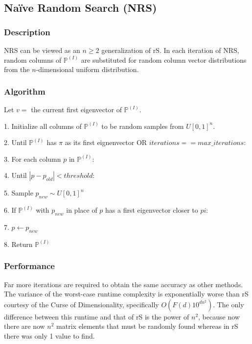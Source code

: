 \documentclass{article}
\begin{document}
\subsection{Na\"ive Random Search (NRS)}
\subsubsection{Description}
NRS can be viewed as an $n \geq 2$ generalization of rS. In each iteration of NRS, random columns of $\mathbb{P}^{(I)}$ are substituted for random column vector distributions from the $n$-dimensional uniform distribution.

\subsubsection{Algorithm}
Let $v=$ the current first eigenvector of $\mathbb{P}^{(I)}$.

1. Initialize all columns of $\mathbb{P}^{(I)}$ to be random samples from $U[0,1]^n$.

2. Until $\mathbb{P}^{(I)}$ has $\pi$ as its first eignenvector OR $iterations == max\_iterations$:

3. \hspace{1cm} For each column $p$ in $\mathbb{P}^{(I)}$:

4. \hspace{1cm}\hspace{1cm} Until $|p - p_{old}|< threshold$:

5. \hspace{1cm}\hspace{1cm}\hspace{1cm} Sample $p_{new} \sim U[0,1]^n$

6. \hspace{1cm}\hspace{1cm}\hspace{1cm} If $\mathbb{P}^{(I)}$ with $p_{new}$ in place of $p$ has a first eigenvector closer to $pi$:

7. \hspace{1cm}\hspace{1cm}\hspace{1cm}\hspace{1cm} $p \leftarrow p_{new}$

8. Return $\mathbb{P}^{(I)}$

\subsubsection{Performance}
Far more iterations are required to obtain the same accuracy as other methods. The variance of the worst-case runtime complexity is exponentially worse than rS courtesy of the Curse of Dimensionality, specifically $O(F(d)10^{dn^2})$. The only difference between this runtime and that of rS is the power of $n^2$, because now there are now $n^2$ matrix elements that must be randomly found whereas in rS there was only 1 value to find.
\end{document}
